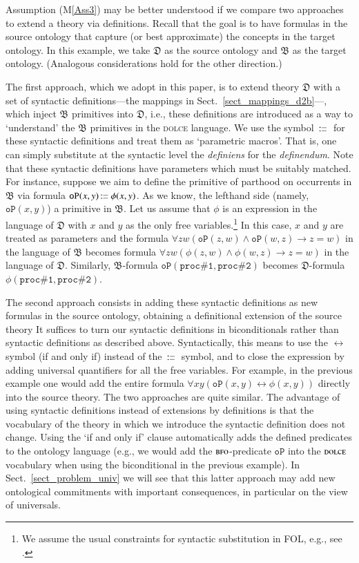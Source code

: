 \documentclass[ao]{iosart2x}
\newcommand{\pr}[1]{\mathtt{#1}}
\newcommand{\cn}[1]{\mathtt{#1}}
\newcommand{\ifif}{\leftrightarrow}
\newcommand\textequal{%
 \rule[.08ex]{5pt}{0.35pt}\llap{\rule[.78ex]{5pt}{0.35pt}}}
\newcommand{\sdef}{{\hspace{1.5pt}:\hspace{-2.5pt}\textequal\hspace{3pt}}}
\newcommand{\dolce}{{\textsc{dolce}}}
\newcommand{\bfo}{{\textsc{bfo}}}
\newcommand {\thdolce} {\ensuremath{\mathfrak{D}}}
\newcommand {\thbfo} {\ensuremath{\mathfrak{B}}}
\newcommand{\bfoopart}{\pr{oP}}
\begin{document}
Assumption (M\ref{Ass3}) may be better understood if we compare two approaches to extend a theory via definitions. 
Recall that the goal is to have formulas in the source ontology that capture (or best approximate) the concepts in the target ontology. In this example, we take {$\thdolce$} as the source ontology and {$\thbfo$} as the target ontology. (Analogous considerations hold for the other direction.)

The first approach, which we adopt in this paper, is to extend theory $\thdolce$ with a set of syntactic definitions---the mappings in Sect.~\ref{sect_mappings_d2b}---, which inject {$\thbfo$} primitives into {$\thdolce$}, i.e., these definitions are introduced as a way to `understand' the {$\thbfo$} primitives in the {\dolce} language. 
We use the symbol {$\sdef$} for these syntactic definitions and treat them as `parametric macros'. That is, one can simply substitute at the syntactic level the \emph{definiens} for the \emph{definendum}. Note that these syntactic definitions have parameters which must be suitably matched. For instance, suppose we aim to define the primitive of parthood on occurrents in {$\thbfo$} via formula $\bfoopart(x,y) \sdef \phi(x,y)$. As we know, the lefthand side (namely, $\bfoopart(x,y)$) a primitive in {$\thbfo$}. Let us assume that $\phi$ is an expression in the language of {$\thdolce$} with $x$ and $y$ as the only free variables.\footnote{We assume the usual constraints for syntactic substitution in FOL, e.g., see \cite{?}.} In this case, $x$ and $y$ are treated as parameters and the formula $\forall zw(\bfoopart(z,w) \land \bfoopart(w,z) \to z=w)$ in the language of {$\thbfo$} becomes formula $\forall zw(\phi(z,w) \land \phi(w,z) \to z=w)$ in the language of {$\thdolce$}. Similarly, {$\thbfo$}-formula $\bfoopart(\cn{proc\#1},\cn{proc\#2})$ becomes {$\thdolce$}-formula $\phi(\cn{proc\#1},\cn{proc\#2})$. 

The second approach consists in adding these syntactic definitions as new formulas in the source ontology, obtaining a definitional extension of the source theory %
It suffices to turn our syntactic definitions in biconditionals rather than syntactic definitions as described above. Syntactically, this means to use the $\ifif$ symbol (if and only if) instead of the $\sdef$ symbol, and to close the expression by adding universal quantifiers for all the free variables. For example, in the previous example one would add the entire formula $\forall xy(\bfoopart(x,y) \ifif \phi(x,y))$ directly into the source theory. The two approaches are quite similar. The advantage of using syntactic definitions instead of extensions by definitions is that the vocabulary of the theory in which we introduce the syntactic definition does not change. Using the `if and only if' clause automatically adds the defined predicates to the ontology language (e.g., we would add the {$\bfo$}-predicate $\bfoopart$ into the {$\dolce$} vocabulary when using the biconditional in the previous example). In Sect.~\ref{sect_problem_univ} we will see that this latter approach may add new ontological commitments with important consequences, in particular on the view of universals.
\end{document}
